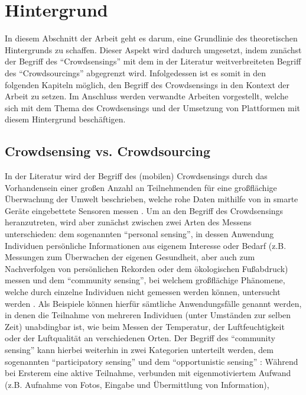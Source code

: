 \chapter{Hintergrund} %
In diesem Abschnitt der Arbeit geht es darum, eine Grundlinie des theoretischen Hintergrunds zu schaffen. Dieser Aspekt wird dadurch umgesetzt, indem 
zunächst der Begriff des \enquote{Crowdsensings} mit dem in der Literatur weitverbreiteten Begriff des \enquote{Crowdsourcings} abgegrenzt wird. Infolgedessen ist es somit in den folgenden Kapiteln möglich, 
den Begriff des Crowdsensings in den Kontext der Arbeit zu setzen. Im Anschluss werden verwandte Arbeiten vorgestellt, welche sich mit dem Thema des Crowdsensings und der Umsetzung von Plattformen mit diesem 
Hintergrund beschäftigen.

\section{Crowdsensing vs. Crowdsourcing}
In der Literatur wird der Begriff des (mobilen) Crowdsensings durch das Vorhandensein einer großen Anzahl an Teilnehmenden für eine großflächige Überwachung der Umwelt 
beschrieben, welche rohe Daten mithilfe von in smarte Geräte eingebettete Sensoren messen \cite{Ray2022}. Um an den Begriff des Crowdsensings heranzutreten, wird aber zunächst 
zwischen zwei Arten des Messens unterschieden: dem sogenannten \enquote{personal sensing}, in dessen Anwendung Individuen persönliche Informationen aus eigenem Interesse oder 
Bedarf (z.B. Messungen zum Überwachen der eigenen Gesundheit, aber auch zum Nachverfolgen von persönlichen Rekorden oder dem ökologischen Fußabdruck) messen und dem \enquote{community sensing}, 
bei welchem großflächige Phänomene, welche durch einzelne Individuen nicht gemessen werden können, untersucht werden \cite{Ganti2011}. \newline Als Beispiele können hierfür sämtliche Anwendungsfälle 
genannt werden, in denen die Teilnahme von mehreren Individuen (unter Umständen zur selben Zeit) unabdingbar ist, wie beim Messen der Temperatur, der Luftfeuchtigkeit oder der Luftqualität an 
verschiedenen Orten. Der Begriff des \enquote{community sensing} kann hierbei weiterhin in zwei Kategorien unterteilt werden, dem sogenannten \enquote{participatory sensing} \cite{Burke2006} 
und dem \enquote{opportunistic sensing} \cite{Lane2010}: \newline Während bei Ersterem eine aktive Teilnahme, verbunden mit eigenmotiviertem Aufwand (z.B. Aufnahme von Fotos, Eingabe und Übermittlung von Information), 
